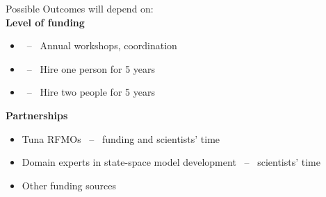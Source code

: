 \documentclass[aspectratio=169,fleqn]{beamer}
\begin{document}
\begin{frame}{Possible Outcomes}\small
  will depend on:\\[3ex]
  \textbf{Level of funding}
  \begin{itemize}
    \item[]  ~--~ Annual workshops, coordination\\[-1ex]
    \item[]  ~--~ Hire one person for 5 years\\[-1ex]
    \item[]  ~--~ Hire two people for 5 years\\[5ex]
  \end{itemize}
  \textbf{Partnerships}
  \begin{itemize}
    \item[] Tuna RFMOs ~--~ funding and scientists' time\\[-1ex]
    \item[] Domain experts in state-space model development ~--~ scientists'
    time\\[-1ex]
    \item[] Other funding sources\\[1ex]
  \end{itemize}
\end{frame}

\end{document}
